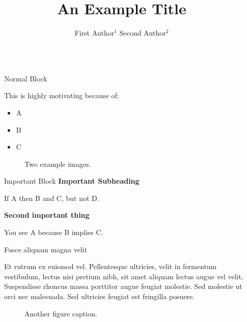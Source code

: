 \documentclass[final]{beamer}
\title{An Example Title}
\author{First Author$^{1}$ \quad Second Author$^{2}$}
\institute[shortinst]{\small{$^1$ First Affiliation  \quad $^2$ Second Affiliation}%
}
\newlength{\sepwidth}
\newlength{\colwidth}
\newcommand{\separatorcolumn}{\begin{column}{\sepwidth}\end{column}}
\begin{document}
\begin{frame}[t]
\begin{columns}[t]
\separatorcolumn

\begin{column}{\colwidth}
   \begin{block}{Normal Block}

                This is highly motivating because of:
                \begin{itemize}
                    \item A \cite{lowry1951protein}
                    \item B \cite{laemmli1970cleavage}
                    \item C \cite{bradford1976rapid}
                \end{itemize}%
                

                \begin{figure}[width=0.66\textwidth]
                    \centering
                    \qquad
                    \caption{Two example images.}
                    \label{fig:images}
                \end{figure}
                
    \begin{alertblock}{Important Block}
        \textbf{Important Subheading}
                
        If A then B and C, but not D.

        \textbf{Second important thing}

        You see A because B implies C.
    \end{alertblock}        
    \end{block}


    \begin{block}{Fusce aliquam magna velit}

    Et rutrum ex euismod vel. Pellentesque ultricies, velit in fermentum
    vestibulum, lectus nisi pretium nibh, sit amet aliquam lectus augue vel
    velit. Suspendisse rhoncus massa porttitor augue feugiat molestie. Sed
    molestie ut orci nec malesuada. Sed ultricies feugiat est fringilla
    posuere.

    \begin{figure}
      \centering
      \caption{Another figure caption.}
    \end{figure}


\end{block}
\end{column}
\end{columns}
\end{frame}
\end{document}
